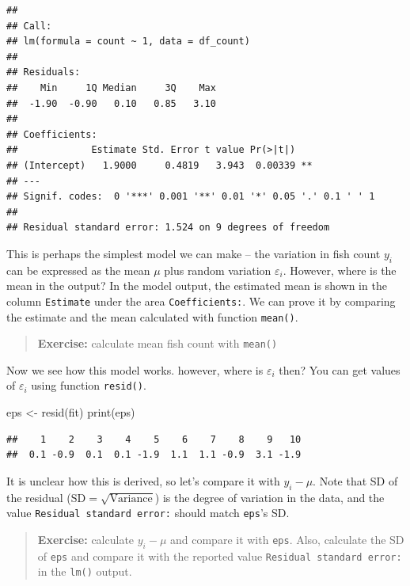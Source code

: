 \documentclass[
]{book}
\newenvironment{Shaded}{\begin{snugshade}}{\end{snugshade}}
\newcommand{\FunctionTok}[1]{\textcolor[rgb]{0.00,0.00,0.00}{#1}}
\newcommand{\NormalTok}[1]{#1}
\newcommand{\OtherTok}[1]{\textcolor[rgb]{0.56,0.35,0.01}{#1}}
\begin{document}
\begin{verbatim}
## 
## Call:
## lm(formula = count ~ 1, data = df_count)
## 
## Residuals:
##    Min     1Q Median     3Q    Max 
##  -1.90  -0.90   0.10   0.85   3.10 
## 
## Coefficients:
##             Estimate Std. Error t value Pr(>|t|)   
## (Intercept)   1.9000     0.4819   3.943  0.00339 **
## ---
## Signif. codes:  0 '***' 0.001 '**' 0.01 '*' 0.05 '.' 0.1 ' ' 1
## 
## Residual standard error: 1.524 on 9 degrees of freedom
\end{verbatim}

This is perhaps the simplest model we can make -- the variation in fish count \(y_i\) can be expressed as the mean \(\mu\) plus random variation \(\varepsilon_i\). However, where is the mean in the output? In the model output, the estimated mean is shown in the column \texttt{Estimate} under the area \texttt{Coefficients:}. We can prove it by comparing the estimate and the mean calculated with function \texttt{mean()}.

\begin{quote}
\textbf{Exercise:} calculate mean fish count with \texttt{mean()}
\end{quote}

Now we see how this model works. however, where is \(\varepsilon_i\) then? You can get values of \(\varepsilon_i\) using function \texttt{resid()}.

\begin{Shaded}
\begin{Highlighting}[]
\NormalTok{eps }\OtherTok{\textless{}{-}} \FunctionTok{resid}\NormalTok{(fit)}
\FunctionTok{print}\NormalTok{(eps)}
\end{Highlighting}
\end{Shaded}

\begin{verbatim}
##    1    2    3    4    5    6    7    8    9   10 
##  0.1 -0.9  0.1  0.1 -1.9  1.1  1.1 -0.9  3.1 -1.9
\end{verbatim}

It is unclear how this is derived, so let's compare it with \(y_i - \mu\). Note that SD of the residual (\(\text{SD} = \sqrt{\text{Variance}}\)) is the degree of variation in the data, and the value \texttt{Residual\ standard\ error:} should match \texttt{eps}'s SD.

\begin{quote}
\textbf{Exercise:} calculate \(y_i - \mu\) and compare it with \texttt{eps}. Also, calculate the SD of \texttt{eps} and compare it with the reported value \texttt{Residual\ standard\ error:} in the \texttt{lm()} output.
\end{quote}
\end{document}
